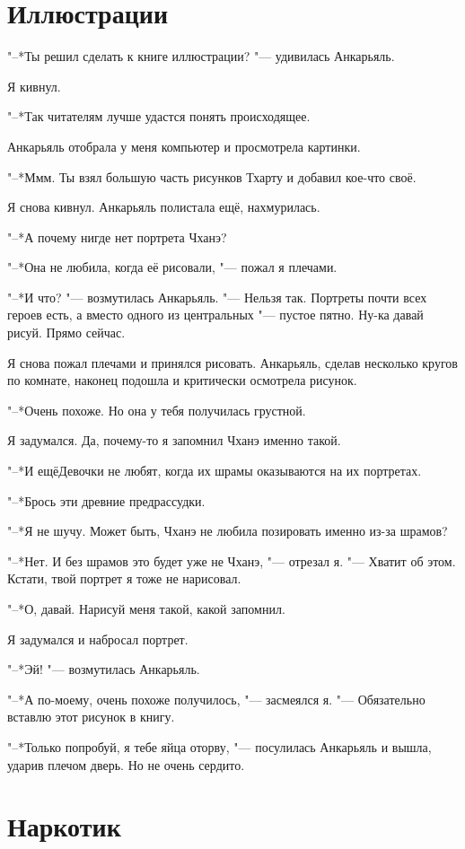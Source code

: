 \section{Иллюстрации}

"--*Ты решил сделать к книге иллюстрации? "--- удивилась Анкарьяль.

Я кивнул.

"--*Так читателям лучше удастся понять происходящее.

Анкарьяль отобрала у меня компьютер и просмотрела картинки.

"--*Ммм.
Ты взял большую часть рисунков Тхарту и добавил кое-что своё.

Я снова кивнул.
Анкарьяль полистала ещё, нахмурилась.

"--*А почему нигде нет портрета Чханэ?

"--*Она не любила, когда её рисовали, "--- пожал я плечами.

"--*И что? "--- возмутилась Анкарьяль.
"--- Нельзя так.
Портреты почти всех героев есть, а вместо одного из центральных "--- пустое пятно.
Ну-ка давай рисуй.
Прямо сейчас.

Я снова пожал плечами и принялся рисовать.
Анкарьяль, сделав несколько кругов по комнате, наконец подошла и критически осмотрела рисунок.

"--*Очень похоже.
Но она у тебя получилась грустной.

Я задумался.
Да, почему-то я запомнил Чханэ именно такой.

"--*И ещё\ldotst Девочки не любят, когда их шрамы оказываются на их портретах.

"--*Брось эти древние предрассудки.

"--*Я не шучу.
Может быть, Чханэ не любила позировать именно из-за шрамов?

"--*Нет.
И без шрамов это будет уже не Чханэ, "--- отрезал я.
"--- Хватит об этом.
Кстати, твой портрет я тоже не нарисовал.

"--*О, давай.
Нарисуй меня такой, какой запомнил.

Я задумался и набросал портрет.

"--*Эй! "--- возмутилась Анкарьяль.

"--*А по-моему, очень похоже получилось, "--- засмеялся я.
"--- Обязательно вставлю этот рисунок в книгу.

"--*Только попробуй, я тебе яйца оторву, "--- посулилась Анкарьяль и вышла, ударив плечом дверь.
Но не очень сердито.

\section{Наркотик}

